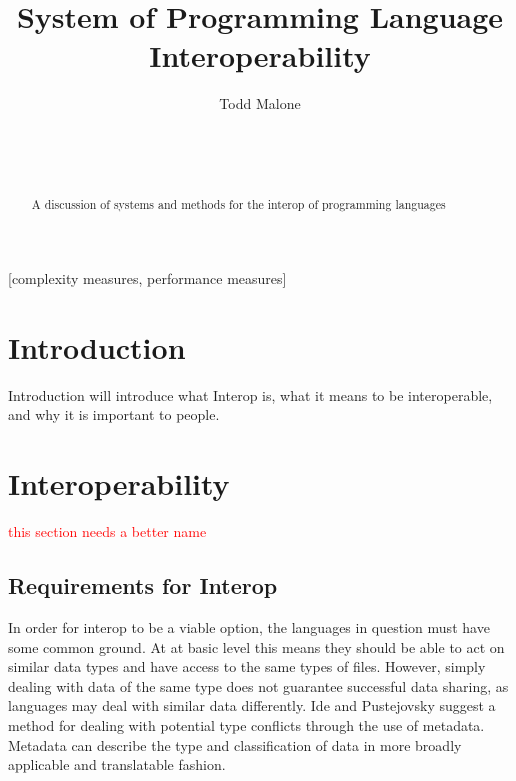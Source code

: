 \documentclass{sig-alternate}
\newcommand{\mycomment}[1]{\textcolor{red}{#1}}
\begin{document}

\title{System of Programming Language Interoperability}

\author{
\alignauthor
Todd Malone\\
	\\
	\\
	\\
}

\maketitle
\begin{abstract}
A discussion of systems and methods for the interop of programming languages
\end{abstract}

[complexity measures, performance measures]



\section{Introduction}
Introduction will introduce what Interop is, what it means to be interoperable, and
why it is important to people.

\section{Interoperability}\label{difficulties}
\mycomment{this section needs a better name}


\subsection*{Requirements for Interop}
In order for interop to be a viable option, the languages in question must have some common ground. At at basic level
this means they should be able to act on similar data types and have access to the same types of files. However, simply dealing with data of the same type does not guarantee successful data sharing, as languages may deal with similar data differently. Ide and Pustejovsky \cite{Ide:2010} suggest a method for dealing with potential type conflicts through the use of metadata. Metadata can describe the type and classification of data in more broadly applicable and translatable fashion.
\end{document}
